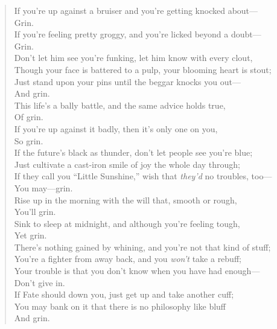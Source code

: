 

\begin{verse}
If you're up against a bruiser and you're getting knocked about---\\
\hspace*{3em}Grin.\\
If you're feeling pretty groggy, and you're licked beyond a doubt---\\
\hspace*{3em}Grin.\\[1.5\baselineskip]

Don't let him see you're funking, let him know with every clout,\\
Though your face is battered to a pulp, your blooming heart is stout;\\
Just stand upon your pins until the beggar knocks you out---\\
\hspace*{3em}And grin.\\[1.5\baselineskip]

This life's a bally battle, and the same advice holds true,\\
\hspace*{3em}Of grin.\\
If you're up against it badly, then it's only one on you,\\
\hspace*{3em}So grin.\\[1.5\baselineskip]

If the future's black as thunder, don't let people see you're blue;\\
Just cultivate a cast-iron smile of joy the whole day through;\\
If they call you ``Little Sunshine,'' wish that \textit{they'd} no troubles, too---\\
\hspace*{3em}You may---grin.\\[1.5\baselineskip]

Rise up in the morning with the will that, smooth or rough,\\
\hspace*{3em}You'll grin.\\
Sink to sleep at midnight, and although you're feeling tough,\\
\hspace*{3em}Yet grin.\\[1.5\baselineskip]

There's nothing gained by whining, and you're not that kind of stuff;\\
You're a fighter from away back, and you \textit{won't} take a rebuff;\\
Your trouble is that you don't know when you have had enough---\\
\hspace*{3em}Don't give in.\\[1.5\baselineskip]

If Fate should down you, just get up and take another cuff;\\
You may bank on it that there is no philosophy like bluff\\
\hspace*{3em}And grin.\\
\end{verse}